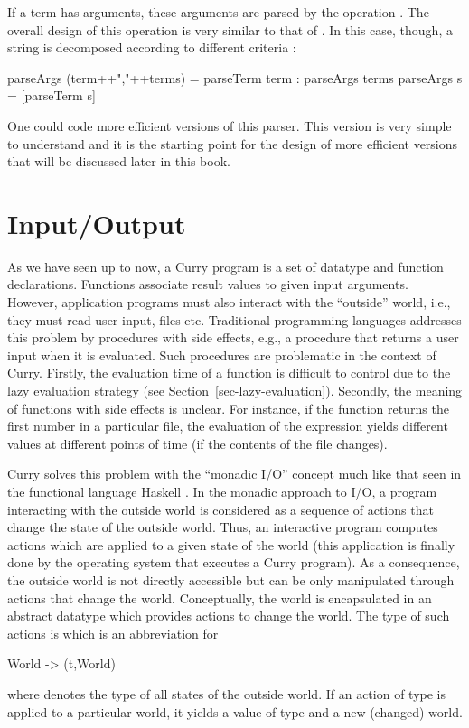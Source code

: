 If a term has arguments, these arguments are parsed by the operation
.
The overall design of this operation is very similar to that
of .
In this case, though, a string is decomposed according to
different criteria
:
%
\begin{curry}
parseArgs (term++","++terms) = parseTerm term : parseArgs terms
parseArgs s = [parseTerm s]
\end{curry}
%
One could code more efficient versions of this parser.
This version is very simple to understand and it is the
starting point for the design of more efficient versions that will be
discussed later in this book.


\section{Input/Output}
\label{sec-io}

As we have seen up to now, a Curry program is a set of datatype
and function declarations. Functions associate result values
to given input arguments. However, application programs must
also interact with the ``outside'' world, i.e., they
must read user input, files etc.
Traditional programming languages addresses this problem
by procedures with side effects, e.g., a procedure 
that returns a user input when it is evaluated.
Such procedures are problematic in the context of Curry.
Firstly, the evaluation time of a function is difficult
to control due to the lazy evaluation strategy
(see Section~\ref{sec-lazy-evaluation}). Secondly,
the meaning of functions with side effects is unclear.
For instance, if the function  returns
the first number in a particular file, the evaluation
of the expression  yields different values
at different points of time (if the contents of the file changes).

Curry solves this problem with the ``monadic I/O'' concept
 much like that seen in the functional language
Haskell \cite{Wadler97}.
In the monadic approach to I/O, a program interacting with
the outside world is considered as a sequence of actions that
change the state of the outside world. Thus, an interactive program
computes actions which are applied to a given state of the world
(this application is finally done by the operating system
that executes a Curry program).
As a consequence, the outside world is not directly
accessible but can be only manipulated through actions that change the world.
Conceptually, the world is encapsulated in an abstract datatype
which provides actions to change the world.
The type of such actions is 
which is an abbreviation for
\begin{curry}
World -> (t,World)
\end{curry}
where  denotes the type of all states of the outside world.
If an action of type  is applied to a particular world,
it yields a value of type  and a new (changed) world.

